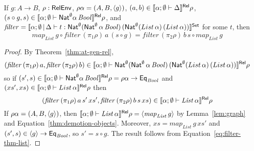 \documentclass[runningheads]{llncs}
\newcommand{\filtype}{\Nat^\emptyset 
 (\Nat^\emptyset \, \alpha \, \mathit{Bool})\, (\Nat^\emptyset 
  (List \, \alpha) \, (List \, \alpha))}
\begin{document}
\begin{theorem} 
If $g : A \to B$, $\rho : \mathsf{RelEnv}$, $\rho \alpha = (A, B, \langle {g} \rangle)$,
$(a, b) \in \llbracket{\alpha ;\emptyset \vdash \Delta}\rrbracket^{\mathsf{Rel}} \rho$, $(s \circ
g, s) \in \llbracket{\alpha; \emptyset \vdash \mathsf{Nat}^\emptyset \alpha \,
  \mathit{Bool}}\rrbracket^{\mathsf{Rel}} \rho$, and %
$\mathit{filter} = \setsem{\alpha; \emptyset \,|\, \Delta \vdash t :
  \filtype}$ for some $t$, then
\[  \mathit{map}_{\mathit{List}} \,g \circ \mathit{filter} \, (\pi_1
\rho) \, a \, (s \circ g) = \mathit{filter}\, (\pi_2\rho) \, b \, s
\circ \mathit{map}_{\mathit{List}} \,g\]
\end{theorem}
\begin{proof}
By Theorem~\ref{thm:at-gen-rel}, \[(\mathit{filter}\, (\pi_1 \rho)\, a,
\mathit{filter}\, (\pi_2 \rho)\, b) \in \relsem{\alpha; \emptyset
  \vdash \filtype} \rho\] so if $(s', s) \in \llbracket{\alpha; \emptyset
  \vdash \mathsf{Nat}^\emptyset \alpha \, \mathit{Bool}}\rrbracket^{\mathsf{Rel}} \rho = \rho\alpha \to
\mathsf{Eq}_{\mathit{Bool}}$ and $(xs', xs) \in \llbracket{\alpha; \emptyset
  \vdash List \, \alpha}\rrbracket^{\mathsf{Rel}} \rho$ then
\begin{equation}\label{eq:filter-thm-list}
  (\mathit{filter}\, (\pi_1\rho) \,a \,s' \,xs', \mathit{filter} \,
  (\pi_2\rho) \,b \,s \,xs) \in \llbracket{\alpha; \emptyset \vdash
    \mathit{List} \, \alpha}\rrbracket^{\mathsf{Rel}} \rho
\end{equation}
If $\rho\alpha = (A, B, \langle {g} \rangle)$, then $\llbracket{\alpha; \emptyset
  \vdash \mathit{List} \, \alpha}\rrbracket^{\mathsf{Rel}} \rho =
\langle {\mathit{map}_{\mathit{List}} \, g} \rangle$ by Lemma~\ref{lem:graph}
and Equation~\ref{thm:demotion-objects}.  Moreover, $xs =
\mathit{map}_{\mathit{List}} \,g \,xs'$ and $(s', s) \in \langle {g} \rangle \to
\mathsf{Eq}_{\mathit{Bool}}$, so $s' = s \circ g$. The result
follows from %
Equation~\ref{eq:filter-thm-list}.\end{proof}
\end{document}

